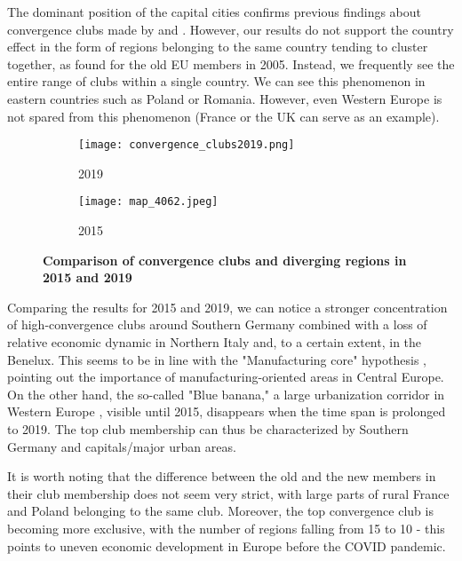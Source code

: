 \documentclass[11pt]{article}
\begin{document}
The dominant position of the capital cities confirms previous findings about convergence clubs made by \citet{sme2012regional} and \citet{bartkowska2012regional}. However, our results do not support the country effect in the form of regions belonging to the same country tending to cluster together, as \citet{bartkowska2012regional} found for the old EU members in 2005. Instead, we frequently see the entire range of clubs within a single country. We can see this phenomenon in eastern countries such as Poland or Romania. However,
even Western Europe is not spared from this phenomenon (France or the UK can serve as an example).


\begin{figure}[!htbp]%
\centering
\begin{subfigure}[c]{0.75\linewidth}
  {
  \texttt{[image: convergence\_clubs2019.png]}
    \caption{2019}
    \label{clubs_graphic_2019}
  }
\end{subfigure}
\qquad
\begin{subfigure}[c]{0.75\linewidth}
  \texttt{[image: map\_4062.jpeg]}
  \caption{2015}
  \label{clubs_graphic_2015}
\end{subfigure}
  \caption{\textbf{Comparison of convergence clubs and diverging regions in 2015 and 2019}}
\label{clubs_graphic}
\end{figure} 


Comparing the results for 2015 and 2019, we can notice a stronger concentration of high-convergence clubs around Southern Germany combined with a loss of relative economic dynamic in Northern Italy and, to a certain extent, in the Benelux. This seems to be in line with the "Manufacturing core" hypothesis \citep{cutrini2019economic, stollinger2016structural}, pointing out the importance of manufacturing-oriented areas in Central Europe. On the other hand, the so-called "Blue banana," a large urbanization corridor in Western Europe \citep{hospers2002beyond}, visible until 2015, disappears when the time span is prolonged to 2019. The top club membership can thus be characterized by Southern Germany and capitals/major urban areas.

It is worth noting that the difference between the old and the new members in their club membership does not seem very strict, with large parts of rural France and Poland belonging to the same club. Moreover, the top convergence club is becoming more exclusive, with the number of regions falling from 15 to 10 - this points to uneven economic development in Europe before the COVID pandemic.
\end{document}
